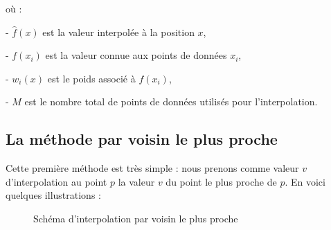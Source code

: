 où :

- \(\hat{f}(x)\) est la valeur interpolée à la position \(x\),

- \(f(x_i)\) est la valeur connue aux points de données \(x_i\),

- \(w_i(x)\) est le poids associé à \(f(x_i)\),

- \(M\) est le nombre total de points de données utilisés pour l'interpolation.




\subsection{La méthode par voisin le plus proche}
Cette première méthode est très simple : nous prenons comme valeur \( v \) d'interpolation au point \( p \) la valeur \( v \) du point le plus proche de \( p \).
En voici quelques illustrations :


\begin{figure}[H]
    \centering
    \caption{Schéma d'interpolation par voisin le plus proche}
    \label{fig:interpolation_voisin}
\end{figure}

